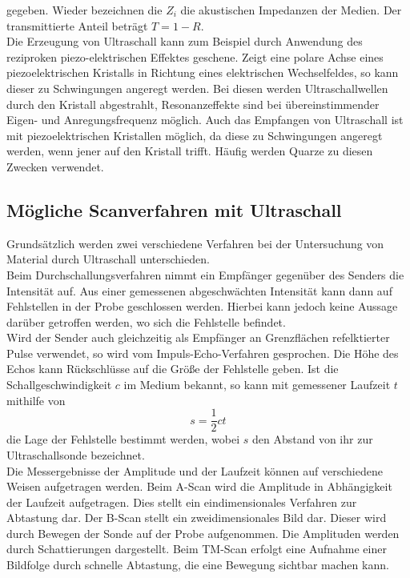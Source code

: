 gegeben. Wieder bezeichnen die $Z_i$ die akustischen Impedanzen der Medien. Der
transmittierte Anteil beträgt $T = 1 - R$.\\
Die Erzeugung von Ultraschall kann zum Beispiel durch Anwendung des reziproken piezo-elektrischen
Effektes geschene. Zeigt eine polare Achse eines piezoelektrischen Kristalls in Richtung
eines elektrischen Wechselfeldes, so kann dieser zu Schwingungen angeregt werden.
Bei diesen werden Ultraschallwellen durch den Kristall abgestrahlt, Resonanzeffekte
sind bei übereinstimmender Eigen- und Anregungsfrequenz möglich. Auch das Empfangen
von Ultraschall ist mit piezoelektrischen Kristallen möglich, da diese zu Schwingungen
angeregt werden, wenn jener auf den Kristall trifft. Häufig werden Quarze zu diesen
Zwecken verwendet.

\subsection{Mögliche Scanverfahren mit Ultraschall}
\label{subsec:theorie2}
Grundsätzlich werden zwei verschiedene Verfahren bei der Untersuchung von Material
durch Ultraschall unterschieden.\\
Beim Durchschallungsverfahren nimmt ein Empfänger gegenüber des Senders die Intensität auf.
Aus einer gemessenen abgeschwächten Intensität kann dann auf Fehlstellen in der Probe geschlossen werden.
Hierbei kann jedoch keine Aussage darüber getroffen werden, wo sich die Fehlstelle befindet.\\
Wird der Sender auch gleichzeitig als Empfänger an Grenzflächen refelktierter Pulse verwendet, so wird vom Impuls-Echo-Verfahren
gesprochen. Die Höhe des Echos kann Rückschlüsse auf die Größe der Fehlstelle geben.
Ist die Schallgeschwindigkeit $c$ im Medium bekannt, so kann mit gemessener Laufzeit $t$
mithilfe von
\begin{equation}
  s = \frac{1}{2} ct
\end{equation}
die Lage der Fehlstelle bestimmt werden, wobei $s$ den Abstand von ihr zur Ultraschallsonde bezeichnet.\\
Die Messergebnisse der Amplitude und der Laufzeit können auf verschiedene Weisen aufgetragen werden.
Beim A-Scan wird die Amplitude in Abhängigkeit der Laufzeit aufgetragen. Dies stellt
ein eindimensionales Verfahren zur Abtastung dar. Der B-Scan stellt ein zweidimensionales
Bild dar. Dieser wird durch Bewegen der Sonde auf der Probe aufgenommen. Die Amplituden
werden durch Schattierungen dargestellt.
Beim TM-Scan erfolgt eine Aufnahme einer Bildfolge durch schnelle Abtastung, die eine Bewegung sichtbar machen kann.
